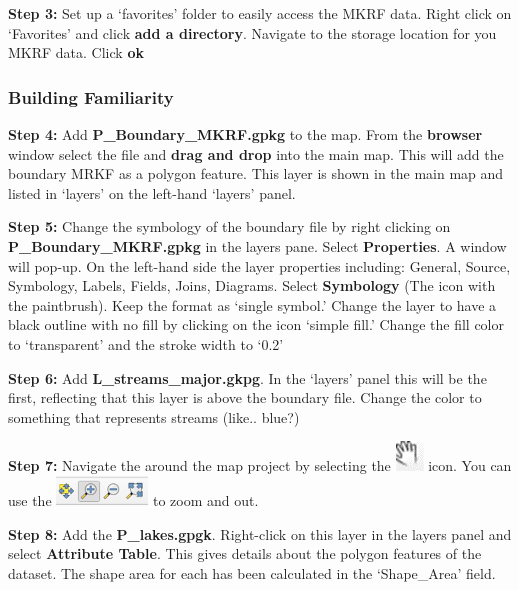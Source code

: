 \documentclass[
  letterpaper,
]{book}
\begin{document}
\textbf{Step 3:} Set up a `favorites' folder to easily access the MKRF
data. Right click on `Favorites' and click \textbf{add a directory}.
Navigate to the storage location for you MKRF data. Click \textbf{ok}

\hypertarget{building-familiarity}{%
\subsubsection*{Building Familiarity}\label{building-familiarity}}

\textbf{Step 4:} Add \textbf{P\_Boundary\_MKRF.gpkg} to the map. From
the \textbf{browser} window select the file and \textbf{drag and drop}
into the main map. This will add the boundary MRKF as a polygon feature.
This layer is shown in the main map and listed in `layers' on the
left-hand `layers' panel.

\textbf{Step 5:} Change the symbology of the boundary file by right
clicking on \textbf{P\_Boundary\_MKRF.gpkg} in the layers pane. Select
\textbf{Properties}. A window will pop-up. On the left-hand side the
layer properties including: General, Source, Symbology, Labels, Fields,
Joins, Diagrams. Select \textbf{Symbology} (The icon with the
paintbrush). Keep the format as `single symbol.' Change the layer to
have a black outline with no fill by clicking on the icon `simple fill.'
Change the fill color to `transparent' and the stroke width to `0.2'

\textbf{Step 6:} Add \textbf{L\_streams\_major.gkpg}. In the `layers'
panel this will be the first, reflecting that this layer is above the
boundary file. Change the color to something that represents streams
(like.. blue?)

\textbf{Step 7:} Navigate the around the map project by selecting the
\includegraphics{images/clipboard-2808075886.png} icon. You can use the
\includegraphics[width=0.95833in,height=\textheight]{images/clipboard-1487886273.png}
to zoom and out.

\textbf{Step 8:} Add the \textbf{P\_lakes.gpgk}. Right-click on this
layer in the layers panel and select \textbf{Attribute Table}. This
gives details about the polygon features of the dataset. The shape area
for each has been calculated in the `Shape\_Area' field.
\end{document}
